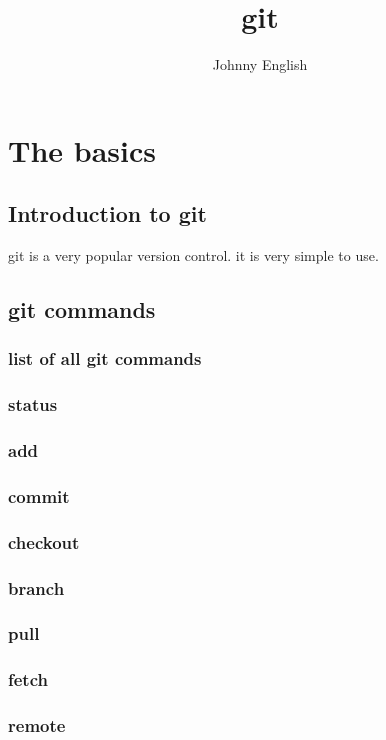 \documentclass{book}
\title{git}
\author{Johnny English}
\begin{document}
\maketitle
{
\hypersetup{linkcolor=black}
\tableofcontents
}
\part{The basics}

\chapter{Introduction to git}
git is a very popular version control. it is very simple to use.
 
\chapter{git commands}
\section{list of all git commands}
\section{status}
\section{add}
\section{commit}
\section{checkout}
\section{branch}
\section{pull}
\section{fetch}
\section{remote}
\end{document}
